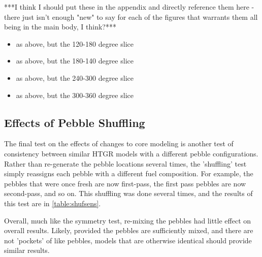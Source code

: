 ***I think I should put these in the appendix and directly reference them here - there just isn't enough "new" to say for each of the figures that warrants them all being in the main body, I think?***
 



\begin{itemize}
\item as above, but the 120-180 degree slice
\end{itemize}


\begin{itemize}
\item as above, but the 180-140 degree slice
\end{itemize}


\begin{itemize}
\item as above, but the 240-300 degree slice
\end{itemize}


\begin{itemize}
\item as above, but the 300-360 degree slice
\end{itemize}

\subsection{Effects of Pebble Shuffling}

The final test on the effects of changes to core modeling is another test of consistency between similar HTGR models with a different pebble configurations.  Rather than re-generate the pebble locations several times, the 'shuffling' test simply reassigns each pebble with a different fuel composition.  For example, the pebbles that were once fresh are now first-pass, the first pass pebbles are now second-pass, and so on.  This shuffling was done several times, and the results of this test are in \ref{table:shufsens}.



Overall, much like the symmetry test, re-mixing the pebbles had little effect on overall results.  Likely, provided the pebbles are sufficiently mixed, and there are not 'pockets' of like pebbles, models that are otherwise identical should provide similar results. 